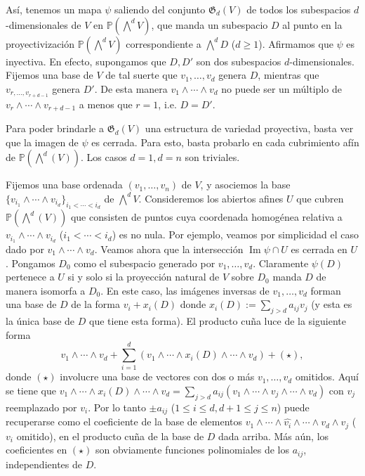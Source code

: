 \documentclass[spanish,10pt]{amsart}
\theoremstyle{definition}
\theoremstyle{remark}
\numberwithin{equation}{section}
\newcommand{\Imagen}{\operatorname{Im}}
\renewcommand{\hat}[1]{\widehat{#1}}
\begin{document}
Así, tenemos un mapa $\psi$ saliendo del conjunto $\mathfrak G_d (V)$ de todos los subespacios $d$-dimensionales de $V$ en $\mathbb{P} (\bigwedge^d V)$, que manda un subespacio $D$ al punto en la proyectivización $\mathbb{P} (\bigwedge^d V)$ correspondiente a $\bigwedge^d D$ ($d \geq 1$). Afirmamos que $\psi$ es inyectiva. En efecto, supongamos que $D,D'$ son dos subespacios $d$-dimensionales. Fijemos una base de $V$ de tal suerte que $v_1, \ldots, v_d$ genera $D$, mientras que $v_{r, \ldots, v_{r + d - 1}}$ genera $D'$. De esta manera $v_1 \wedge \cdots \wedge v_d$ no puede ser un múltiplo de $v_r \wedge \cdots \wedge v_{r+d - 1}$ a menos que $r = 1$, i.e. $D = D'$.

Para poder brindarle a $\mathfrak G _d (V)$ una estructura de variedad proyectiva, basta ver que la imagen de $\psi$ es cerrada. Para esto, basta probarlo en cada cubrimiento afín de $\mathbb{P}(\bigwedge^d (V))$. Los casos $d = 1, d = n$ son triviales.

Fijemos una base ordenada $(v_1, \ldots, v_n)$ de $V$, y asociemos la base $\{v_{i_1} \wedge \cdots \wedge v_{i_d}\}_{i_1 < \cdots < i_d}$ de $\bigwedge^d V$. Consideremos los abiertos afines $U$ que cubren $\mathbb{P} (\bigwedge^d (V))$ que consisten de puntos cuya coordenada homogénea relativa a $v_{i_1} \wedge \cdots \wedge v_{i_d}$ ($i_1 < \cdots < i_d$) es no nula. Por ejemplo, veamos por simplicidad el caso dado por $v_1 \wedge \cdots \wedge v_d$. Veamos ahora que la intersección $\Imagen \psi \cap U$ es cerrada en $U$. Pongamos $D_0$ como el subespacio generado por $v_1, \ldots, v_d$. Claramente $\psi (D)$ pertenece a $U$ si y solo si la proyección natural de $V$ sobre $D_0$ manda $D$ de manera isomorfa a $D_0$. En este caso, las imágenes inversas de $v_1, \ldots, v_d$ forman una base de $D$ de la forma $v_i + x_i (D)$ donde $x_i (D) := \sum_{j > d} a_{ij} v_j$ (y esta es la única base de $D$ que tiene esta forma). El producto cuña luce de la siguiente forma
\[
    v_1 \wedge \cdots \wedge v_d + \sum_{i = 1}^d (v_1 \wedge \cdots \wedge x_i (D) \wedge \cdots \wedge v_d) + (\star),
\]
donde $(\star)$ involucre una base de vectores con dos o más $v_1, \ldots, v_d$ omitidos. Aquí se tiene que $v_1 \wedge \cdots \wedge x_i (D) \wedge \cdots \wedge v_d = \sum_{j > d} a_{ij} (v_1 \wedge \cdots \wedge v_j \wedge \cdots \wedge v_d)$ con $v_j$ reemplazado por $v_i$. Por lo tanto $\pm a_{ij}$ ($ 1 \leq i \leq d, d + 1 \leq j \leq n$) puede recuperarse como el coeficiente de la base de elementos $v_1 \wedge \cdots \wedge \hat {v_i} \wedge \cdots \wedge v_d \wedge v_j$ ($v_i$ omitido), en el producto cuña de la base de $D$ dada arriba. Más aún, los coeficientes en $(\star)$ son obviamente funciones polinomiales de los $a_{ij}$, independientes de $D$.
\end{document}
